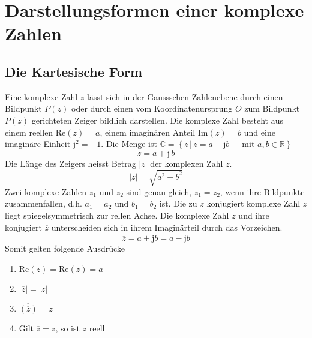 \section{Darstellungsformen einer komplexe Zahlen}
\subsection{Die Kartesische Form}
Eine komplexe Zahl $z$ lässt sich in der Gaussschen Zahlenebene durch einen Bildpunkt $P\left(z\right)$ oder durch einen vom Koordinatenursprung $O$ zum Bildpunkt $P\left(z\right)$ gerichteten Zeiger bildlich darstellen. Die komplexe Zahl besteht aus einem reellen $\text{Re}\left(z\right)=a$, einem imaginären Anteil $\text{Im}\left(z\right)=b$ und eine imaginäre Einheit $\text{j}^2=-1$. Die Menge ist $\mathbb{C}=\left\{z\,\vert\, z=a+\text{j}b\quad\,\text{ mit }a,b\in \mathbb{R}\right\}$
\begin{equation}
\boxed{z=a+\text{j}\,b}
\end{equation}
Die Länge des Zeigers heisst Betrag $\Big\vert z\Big\vert$ der komplexen Zahl $z$. 
\begin{equation}
\boxed{\Big\vert z\Big\vert=\sqrt{a^2+b^2}}
\end{equation}
Zwei komplexe Zahlen $z_1$ und $z_2$ sind genau gleich, $z_1=z_2$, wenn ihre Bildpunkte zusammenfallen, d.h. $a_1=a_2$ und $b_1=b_2$ ist.
\newline\newline
Die zu $z$ konjugiert komplexe Zahl $\overline{z}$ liegt spiegelsymmetrisch zur rellen Achse. Die komplexe Zahl $z$ und ihre konjugiert $\overline{z}$ unterscheiden sich in ihrem Imaginärteil durch das Vorzeichen.
\begin{equation}
\boxed{\overline{z}=\overline{a+\text{j}b}=a-\text{j}b}
\end{equation}
Somit gelten folgende Ausdrücke
\begin{enumerate}[$(i)$]
\item $\text{Re}\left(\overline{z}\right)=\text{Re}\left(z\right)=a$
\item $\Big\vert \overline{z}\Big\vert=\Big\vert z\Big\vert$
\item $\overline{\left(\overline{z}\right)}=z$
\item Gilt $\overline{z}=z$, so ist $z$ reell
\end{enumerate}
